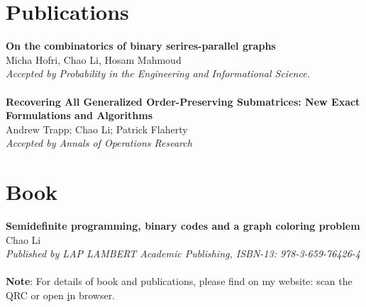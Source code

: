 \documentclass[]{friggeri-cv}
\begin{document}
\section{Publications}
\textbf{On the combinatorics of binary serires-parallel graphs}\\
Micha Hofri, Chao Li, Hosam Mahmoud\\
\emph{Accepted by Probability in the Engineering and Informational Science.}\\
\vspace{-3mm}\\
\textbf{Recovering All Generalized Order-Preserving Submatrices: New Exact
Formulations and Algorithms}\\
Andrew Trapp; Chao Li; Patrick Flaherty\\
\emph{Accepted by Annals of Operations Research}
\section{Book}
\textbf{Semidefinite programming, binary codes and a graph coloring problem}\\
Chao Li\\
\emph{Published by LAP LAMBERT Academic Publishing, ISBN-13: 978-3-659-76426-4}
~\\
\textbf{Note}: For details of book and publications, please find on my website: scan the QRC or open \href{http://chaopli.github.io} in browser.
\end{document}
